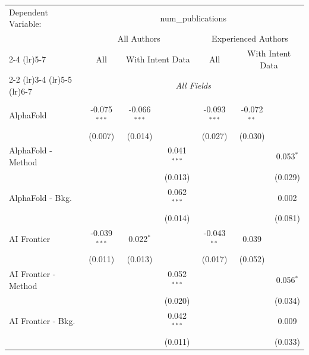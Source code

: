 \begingroup
\centering
\begin{tabular}{lcccccc}
   \tabularnewline \midrule \midrule
   Dependent Variable: & \multicolumn{6}{c}{num\_publications}\\
 & \multicolumn{3}{c}{All Authors} & \multicolumn{3}{c}{Experienced Authors} \\
\cmidrule(lr){2-4} \cmidrule(lr){5-7}
 & \multicolumn{1}{c}{All} & \multicolumn{2}{c}{With Intent Data} & \multicolumn{1}{c}{All} & \multicolumn{2}{c}{With Intent Data} \\
\cmidrule(lr){2-2} \cmidrule(lr){3-4} \cmidrule(lr){5-5} \cmidrule(lr){6-7}
 & \multicolumn{6}{c}{\textit{All Fields}} \\ \\
   AlphaFold            & -0.075$^{***}$ & -0.066$^{***}$ &               & -0.093$^{***}$ & -0.072$^{**}$  &   \\   
                        & (0.007)        & (0.014)        &               & (0.027)        & (0.030)        &   \\   
   AlphaFold - Method   &                &                & 0.041$^{***}$ &                &                & 0.053$^{*}$\\   
                        &                &                & (0.013)       &                &                & (0.029)\\   
   AlphaFold - Bkg.     &                &                & 0.062$^{***}$ &                &                & 0.002\\   
                        &                &                & (0.014)       &                &                & (0.081)\\   
   AI Frontier          & -0.039$^{***}$ & 0.022$^{*}$    &               & -0.043$^{**}$  & 0.039          &   \\   
                        & (0.011)        & (0.013)        &               & (0.017)        & (0.052)        &   \\   
   AI Frontier - Method &                &                & 0.052$^{***}$ &                &                & 0.056$^{*}$\\   
                        &                &                & (0.020)       &                &                & (0.034)\\   
   AI Frontier - Bkg.   &                &                & 0.042$^{***}$ &                &                & 0.009\\   
                        &                &                & (0.011)       &                &                & (0.033)\\   

\end{tabular}
